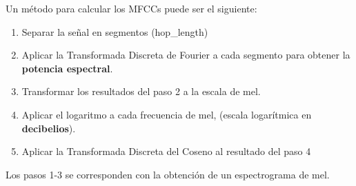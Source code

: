 Un método para calcular los MFCCs puede ser el siguiente:

\begin{enumerate}
\def\labelenumi{\arabic{enumi}.}
\item
  Separar la señal en segmentos (hop\_length)
\item
  Aplicar la Transformada Discreta de Fourier a cada segmento para
  obtener la \textbf{potencia espectral}.
\item
  Transformar los resultados del paso 2 a la escala de mel.
\item
  Aplicar el logaritmo a cada frecuencia de mel, (escala logarítmica en
  \textbf{decibelios}).
\item
  Aplicar la Transformada Discreta del Coseno al resultado del paso 4
\end{enumerate}

Los pasos 1-3 se corresponden con la obtención de un espectrograma de mel.

